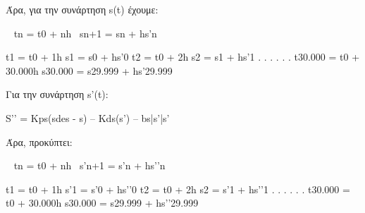 \documentclass[a4paper]{article}
\begin{document}
        Άρα, για την συνάρτηση s(t) έχουμε:

        ~ tn = t0 + nh					~sn+1 = sn  + hs’n

        t1 = t0  + 1h					   s1    = s0  + hs’­­­0
        t2 = t0  + 2h					   s2    = s1  + hs’1
            .						     .
            .						     .
            .						     .
        t30.000 = t0 + 30.000h			    s30.000 = s29.999 + hs’29.999
            
        Για την συνάρτηση s’(t):

            S’’	= Kps(sdes - s) – Kds(s’) – bs|s’|s’

            Άρα, προκύπτει:

        ~ tn = t0 + nh					~s’n+1 = s’n  + hs’’n

        t1 = t0  + 1h					   s’1    = s’0  + hs’’­­­0
        t2 = t0  + 2h					   s2    = s’1  + hs’’1
            .						     .
            .						     .
            .						     .
        t30.000 = t0 + 30.000h			   s30.000 = s29.999 + hs’’29.999
\end{document}
